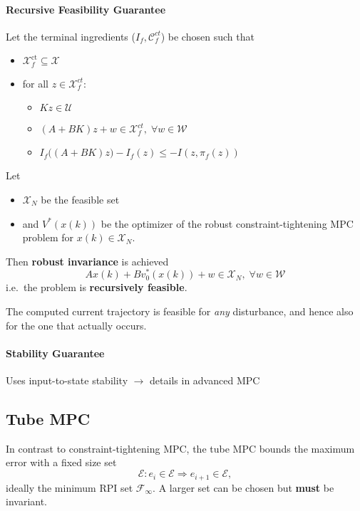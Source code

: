 \paragraph{Recursive Feasibility Guarantee}

Let the terminal ingredients ($I_f, \mathcal{C}_f^{ct}$) be chosen such that
\begin{itemize}
    \item $\mathcal{X}_f^{\mathrm{ct}}\subseteq \mathcal{X}$
    \item for all $z\in \mathcal{X}_f^{ct}$:
          \begin{itemize}
              \item $Kz \in \mathcal{U}$
              \item $(A+BK) z + w \in \mathcal{X}_f^{ct}, \; \forall w \in \mathcal{W}$
              \item $I_f\bigl((A+BK)z\bigr) - I_f(z) \leq -I(z, \pi_f(z))$
          \end{itemize}
\end{itemize}
\newpar{}
Let
\begin{itemize}
    \item $\mathcal{X}_N$ be the feasible set
    \item and $V^*(x(k))$ be the optimizer of the robust constraint-tightening MPC problem for $x(k)\in\mathcal{X}_N$.
\end{itemize}
\newpar{}
Then \textbf{robust invariance} is achieved
\begin{equation*}
    Ax(k) + Bv_0^*(x(k)) + w \in \mathcal{X}_N, \; \forall w \in \mathcal{W}
\end{equation*}
i.e.\ the problem is \textbf{recursively feasible}.
\newpar{}

The computed current trajectory is feasible for \textit{any} disturbance, and hence also for the one that actually occurs.

\paragraph{Stability Guarantee}
Uses input-to-state stability $\rightarrow$ details in advanced MPC

\subsection{Tube MPC}
In contrast to constraint-tightening MPC, the tube MPC bounds the maximum error with a fixed size set
\begin{equation*}
    \mathcal{E}:e_i \in \mathcal{E} \Rightarrow e_{i+1}\in \mathcal{E},
\end{equation*}
ideally the minimum RPI set $\mathcal{F}_\infty$. A larger set can be chosen but \textbf{must} be invariant.

